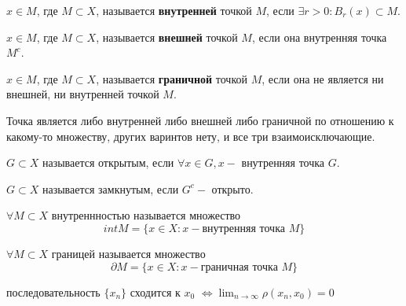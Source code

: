 \begin{definition}
	$x \in M$, где $M \subset X$, называется \textbf{внутренней} точкой $M$, если $\exists r > 0: B_r(x) \subset M$.
\end{definition}

\begin{definition}
	$x \in M$, где $M \subset X$, называется \textbf{внешней} точкой $M$, если она внутренняя точка $M^c$.
\end{definition}

\begin{definition}
	$x \in M$, где $M \subset X$, называется \textbf{граничной} точкой $M$, если она не является ни внешней, ни внутренней точкой $M$.
\end{definition}

\begin{claim}
	Точка является либо внутренней либо внешней либо граничной по отношению к какому-то множеству, других варинтов нету, и все три взаимоисключающие.
\end{claim}

\begin{definition}
	$G \subset X$ называется открытым, если $\forall x \in G, x - $ внутренняя точка $G$.
\end{definition}

\begin{definition}
	$G \subset X$ называется замкнутым, если $G^c -$ открыто.
\end{definition}

\begin{definition}
	$\forall M \subset X$ внутреннностью называется множество
	\[ intM = \{ x\in X : x - \text{внутренняя точка } M \} \]
\end{definition}

\begin{definition}
	$\forall M \subset X$ границей называется множество
	\[ \partial M = \{ x\in X : x - \text{граничная точка } M \} \]
\end{definition}

\begin{definition}
	последовательность $\{x_n\}$ сходится к $x_0$ $\Leftrightarrow \lim_{n\to\infty} \rho(x_n, x_0) = 0$
\end{definition}

